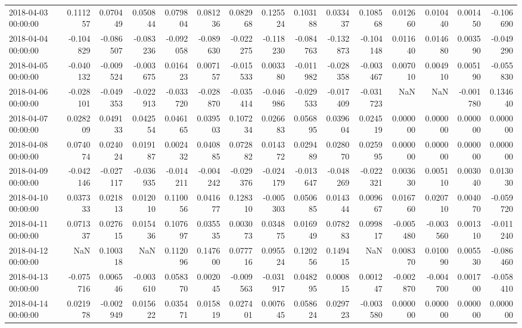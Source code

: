 \begin{tabular}{lrrrrrrrrrrrrrr}
2018-04-03 00:00:00 & 0.111257 & 0.070449 & 0.050844 & 0.079804 & 0.081236 & 0.082968 & 0.125524 & 0.103188 & 0.033437 & 0.108568 & 0.012660 & 0.010440 & 0.001450 & -0.106690 \\
2018-04-04 00:00:00 & -0.104829 & -0.086507 & -0.083236 & -0.092058 & -0.089630 & -0.022275 & -0.118230 & -0.084763 & -0.132873 & -0.104148 & 0.011640 & 0.014680 & 0.003590 & -0.049290 \\
2018-04-05 00:00:00 & -0.040132 & -0.009524 & -0.003675 & 0.016423 & 0.007157 & -0.015533 & 0.003380 & -0.011982 & -0.028358 & -0.003467 & 0.007010 & 0.004910 & 0.005190 & -0.055830 \\
2018-04-06 00:00:00 & -0.028101 & -0.049353 & -0.022913 & -0.033720 & -0.028870 & -0.035414 & -0.046986 & -0.029533 & -0.017409 & -0.031723 & NaN & NaN & -0.001780 & 0.134640 \\
2018-04-07 00:00:00 & 0.028209 & 0.049133 & 0.042554 & 0.046165 & 0.039503 & 0.107234 & 0.026683 & 0.056895 & 0.039604 & 0.024519 & 0.000000 & 0.000000 & 0.000000 & 0.000000 \\
2018-04-08 00:00:00 & 0.074074 & 0.024024 & 0.019187 & 0.002432 & 0.040885 & 0.072882 & 0.014372 & 0.029489 & 0.028070 & 0.025995 & 0.000000 & 0.000000 & 0.000000 & 0.000000 \\
2018-04-09 00:00:00 & -0.042146 & -0.027117 & -0.036935 & -0.014211 & -0.004242 & -0.029376 & -0.024179 & -0.013647 & -0.048269 & -0.022321 & 0.003630 & 0.005110 & 0.003040 & 0.013030 \\
2018-04-10 00:00:00 & 0.037333 & 0.021813 & 0.012010 & 0.110056 & 0.041677 & 0.128310 & -0.005303 & 0.050685 & 0.014344 & 0.009667 & 0.016760 & 0.020710 & 0.004070 & -0.059720 \\
2018-04-11 00:00:00 & 0.071337 & 0.027615 & 0.015436 & 0.107697 & 0.035535 & 0.003073 & 0.034875 & 0.016949 & 0.078283 & 0.099817 & -0.005480 & -0.003560 & 0.001310 & -0.011240 \\
2018-04-12 00:00:00 & NaN & 0.100318 & NaN & 0.112096 & 0.147600 & 0.077716 & 0.095524 & 0.120256 & 0.149415 & NaN & 0.008370 & 0.010090 & 0.005530 & -0.086460 \\
2018-04-13 00:00:00 & -0.075716 & 0.006546 & -0.003610 & 0.058370 & 0.002045 & -0.009563 & -0.031917 & 0.048295 & 0.000815 & 0.001247 & -0.002870 & -0.004700 & 0.001700 & -0.058410 \\
2018-04-14 00:00:00 & 0.021978 & -0.002949 & 0.015622 & 0.035471 & 0.015819 & 0.027401 & 0.007645 & 0.058624 & 0.029723 & -0.003580 & 0.000000 & 0.000000 & 0.000000 & 0.000000 \\

\end{tabular}
